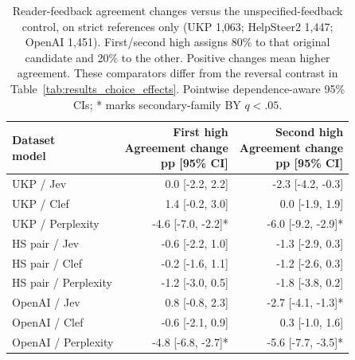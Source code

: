 \begin{table}[t]
\centering\footnotesize
\setlength{\tabcolsep}{3.5pt}
\begin{tabular}{@{}lrr@{}}
\toprule
\shortstack[l]{Dataset\\{}model} & \shortstack[l]{First high\\{}Agreement change\\{}pp [95\% CI]} & \shortstack[l]{Second high\\{}Agreement change\\{}pp [95\% CI]} \\
\midrule
UKP / Jev & 0.0 [-2.2, 2.2] & -2.3 [-4.2, -0.3] \\
UKP / Clef & 1.4 [-0.2, 3.0] & 0.0 [-1.9, 1.9] \\
UKP / Perplexity & -4.6 [-7.0, -2.2]* & -6.0 [-9.2, -2.9]* \\
HS pair / Jev & -0.6 [-2.2, 1.0] & -1.3 [-2.9, 0.3] \\
HS pair / Clef & -0.2 [-1.6, 1.1] & -1.2 [-2.6, 0.3] \\
HS pair / Perplexity & -1.2 [-3.0, 0.5] & -1.8 [-3.8, 0.2] \\
OpenAI / Jev & 0.8 [-0.8, 2.3] & -2.7 [-4.1, -1.3]* \\
OpenAI / Clef & -0.6 [-2.1, 0.9] & 0.3 [-1.0, 1.6] \\
OpenAI / Perplexity & -4.8 [-6.8, -2.7]* & -5.6 [-7.7, -3.5]* \\
\bottomrule
\end{tabular}
\caption{Reader-feedback agreement changes versus the unspecified-feedback control, on strict references only (UKP 1,063; HelpSteer2 1,447; OpenAI 1,451). First/second high assigns 80\% to that original candidate and 20\% to the other. Positive changes mean higher agreement. These comparators differ from the reversal contrast in Table~\ref{tab:results_choice_effects}. Pointwise dependence-aware 95\% CIs; * marks secondary-family BY $q<.05$.}
\label{tab:appendix_reader_alignment}
\end{table}
